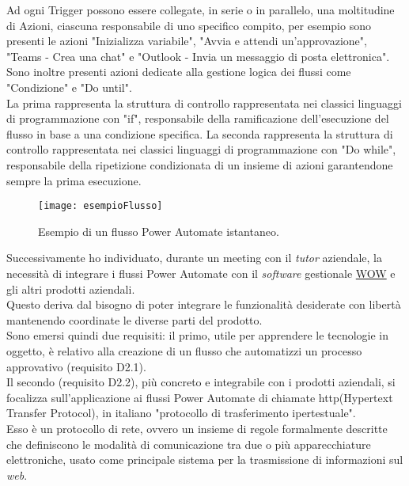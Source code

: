 \noindent Ad ogni Trigger possono essere collegate, in serie o in parallelo, una moltitudine di Azioni, ciascuna responsabile di uno specifico compito, per esempio sono presenti le azioni "Inizializza variabile", "Avvia e attendi un'approvazione", "Teams - Crea una chat" e "Outlook - Invia un messaggio di posta elettronica".\\
Sono inoltre presenti azioni dedicate alla gestione logica dei flussi come "Condizione" e "Do until".\\
La prima rappresenta la struttura di controllo rappresentata nei classici linguaggi di programmazione con "if", responsabile della ramificazione dell'esecuzione del flusso in base a una condizione specifica.
La seconda rappresenta la struttura di controllo rappresentata nei classici linguaggi di programmazione con "Do while", responsabile della ripetizione condizionata di un insieme di azioni garantendone sempre la prima esecuzione.
\begin{figure}[htbp] 
    \centering 
    \texttt{[image: esempioFlusso]} 
    \caption{Esempio di un flusso Power Automate istantaneo.}
    \label{fig:esempioFlusso}
\end{figure}
\newline \noindent Successivamente ho individuato, durante un meeting con il \emph{tutor} aziendale, la necessità di integrare i flussi Power Automate con il \emph{software} gestionale \hyperref[WOW]{WOW} e gli altri prodotti aziendali.\\
Questo deriva dal bisogno di poter integrare le funzionalità desiderate con libertà mantenendo coordinate le diverse parti del prodotto.\\
Sono emersi quindi due requisiti: il primo, utile per apprendere le tecnologie in oggetto, è relativo alla creazione di un flusso che automatizzi un processo approvativo (requisito D2.1).\\
Il secondo (requisito D2.2), più concreto e integrabile con i prodotti aziendali, si focalizza sull'applicazione ai flussi Power Automate di chiamate \gls{http}(Hypertext Transfer Protocol), in italiano "protocollo di trasferimento ipertestuale".\\
Esso è un protocollo di rete, ovvero un insieme di regole formalmente descritte che definiscono le modalità di comunicazione tra due o più apparecchiature elettroniche, usato come principale sistema per la trasmissione di informazioni sul \emph{web}.
